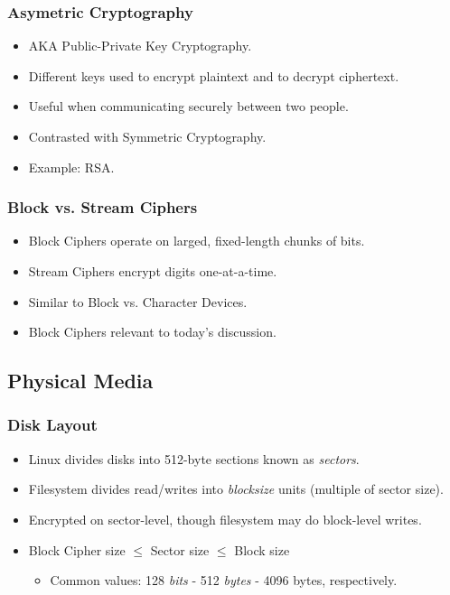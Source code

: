 \documentclass[xcolor={dvipsnames,svgnames},hyperref=dvips]{beamer}
\begin{document}
	\begin{frame}
		\frametitle{Asymetric Cryptography}
		\begin{itemize}
		\item AKA Public-Private Key Cryptography.
		\item Different keys used to encrypt plaintext and to decrypt ciphertext.
		\item Useful when communicating securely between two people.
		\item Contrasted with Symmetric Cryptography.
		\item Example: RSA.
		\end{itemize}
	\end{frame}

	\begin{frame}
		\frametitle{Block vs. Stream Ciphers}
		\begin{itemize}
		\item Block Ciphers operate on larged, fixed-length chunks of bits.
		\item Stream Ciphers encrypt digits one-at-a-time.
		\item Similar to Block vs. Character Devices.
		\item Block Ciphers relevant to today's discussion.
		\end{itemize}
	\end{frame}

	\subsection{Physical Media}
	\begin{frame}
		\frametitle{Disk Layout}
		\begin{itemize}
		\item Linux divides disks into 512-byte sections known as \textit{sectors}.
		\item Filesystem divides read/writes into \textit{blocksize} units (multiple of sector size).
		\item Encrypted on sector-level, though filesystem may do block-level writes.
		\item Block Cipher size $\leq$ Sector size $\leq$ Block size
			\begin{itemize}
			\item Common values: 128 \textit{bits} - 512 \textit{bytes} - 4096 bytes, respectively.
			\end{itemize}
		\end{itemize}
	\end{frame}
\end{document}
